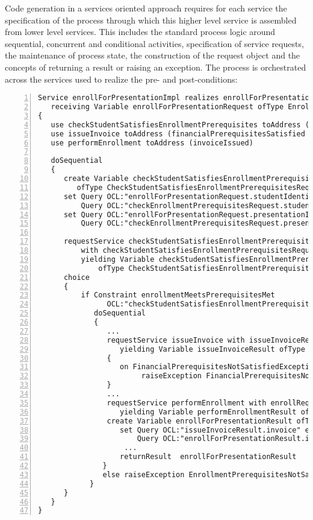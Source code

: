 Code generation in a services oriented approach requires for each service the specification of the process through which this higher level service is assembled from lower level services. This includes the standard process logic around sequential, concurrent and conditional activities, specification of service requests, the maintenance of process state, the construction of the request object and the concepts of returning a result or raising an exception. The process is orchestrated across the services used to realize the pre- and post-conditions:
\tiny \begin{lstlisting}[numbers=left,escapechar=|]
Service enrollForPresentationImpl realizes enrollForPresentation 
   receiving Variable enrollForPresentationRequest ofType EnrollForPresentationRequest
{
   use checkStudentSatisfiesEnrollmentPrerequisites toAddress (enrollmentPrerequisitesMet)
   use issueInvoice toAddress (financialPrerequisitesSatisfied invoiceIssued) 
   use performEnrollment toAddress (invoiceIssued)
   
   doSequential
   {
      create Variable checkStudentSatisfiesEnrollmentPrerequisitesRequest 
         ofType CheckStudentSatisfiesEnrollmentPrerequisitesRequest               
      set Query OCL:"enrollForPresentationRequest.studentIdentifier" equalTo 
          Query OCL:"checkEnrollmentPrerequisitesRequest.studentIdentifier"
      set Query OCL:"enrollForPresentationRequest.presentationIdentifier" equalTo
          Query OCL:"checkEnrollmentPrerequisitesRequest.presentationIdentifier"
                     
      requestService checkStudentSatisfiesEnrollmentPrerequisites 
          with checkStudentSatisfiesEnrollmentPrerequisitesRequest 
          yielding Variable checkStudentSatisfiesEnrollmentPrerequisitesResult
              ofType CheckStudentSatisfiesEnrollmentPrerequisitesResult
      choice
      {
          if Constraint enrollmentMeetsPrerequisitesMet 
                OCL:"checkStudentSatisfiesEnrollmentPrerequisitesResult.enrollmentPrerequisitesMet = true"
             doSequential
             {
                ...
                requestService issueInvoice with issueInvoiceRequest 
                   yielding Variable issueInvoiceResult ofType IssueInvoiceResult
                {
                   on FinancialPrerequisitesNotSatisfiedException 
                        raiseException FinancialPrerequisitesNotSatisfiedException
                }
				...
                requestService performEnrollment with enrollRequest 
                   yielding Variable performEnrollmentResult ofType PerformEnrollmentResult
                create Variable enrollForPresentationResult ofType EnrollForPresentationResult
                   set Query OCL:"issueInvoiceResult.invoice" equalTo
                       Query OCL:"enrollForPresentationResult.invoice"
     				...                       
                   returnResult  enrollForPresentationResult
               }
               else raiseException EnrollmentPrerequisitesNotSatisfiedException
            }
      }
   }         
}           
\end{lstlisting}\normalsize
